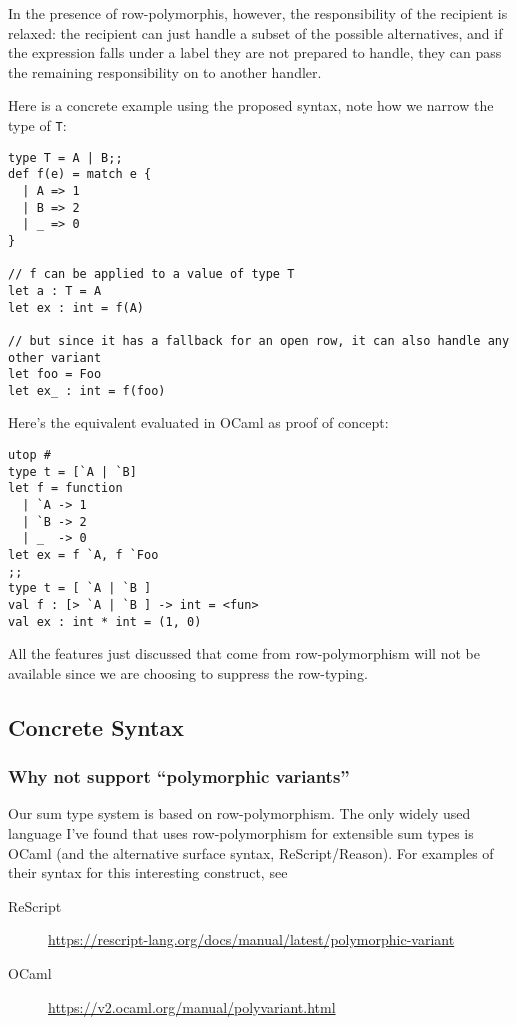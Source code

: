 \documentclass[11pt]{article}
\begin{document}
\begin{enumerate}
In the presence of row-polymorphis, however, the responsibility of the
recipient is relaxed: the recipient can just handle a subset of the
possible alternatives, and if the expression falls under a label they
are not prepared to handle, they can pass the remaining responsibility
on to another handler.

Here is a concrete example using the proposed syntax, note how we narrow
the type of \texttt{T}:

\begin{verbatim}
type T = A | B;;
def f(e) = match e {
  | A => 1
  | B => 2
  | _ => 0
}

// f can be applied to a value of type T
let a : T = A
let ex : int = f(A)

// but since it has a fallback for an open row, it can also handle any other variant
let foo = Foo
let ex_ : int = f(foo)
\end{verbatim}

Here's the equivalent evaluated in OCaml as proof of concept:

\begin{verbatim}
utop # 
type t = [`A | `B]
let f = function
  | `A -> 1
  | `B -> 2
  | _  -> 0
let ex = f `A, f `Foo
;;
type t = [ `A | `B ]
val f : [> `A | `B ] -> int = <fun>
val ex : int * int = (1, 0)
\end{verbatim}

All the features just discussed that come from row-polymorphism will not be
available since we are choosing to suppress the row-typing.
\end{enumerate}

\subsection{Concrete Syntax}
\label{sec:orgb377490}

\subsubsection{Why not support ``polymorphic variants''}
\label{sec:org4566b03}
Our sum type system is based on row-polymorphism. The only widely used language
I've found that uses row-polymorphism for extensible sum types is OCaml (and the
alternative surface syntax, ReScript/Reason). For examples of their syntax for
this interesting construct, see

\begin{description}
\item[{ReScript}] \url{https://rescript-lang.org/docs/manual/latest/polymorphic-variant}
\item[{OCaml}] \url{https://v2.ocaml.org/manual/polyvariant.html}
\end{description}
\end{document}
